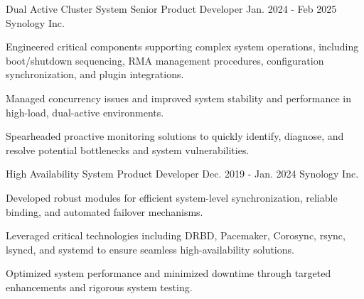 
\begin{cventries}

  \cventry
    {Dual Active Cluster System} %
    {Senior Product Developer} %
    {Jan. 2024 - Feb 2025} %
    {Synology Inc.} %
    {
      \begin{cvitems} %
        \item {Engineered critical components supporting complex system operations, including boot/shutdown sequencing, RMA management procedures, configuration synchronization, and plugin integrations.}
        \item {Managed concurrency issues and improved system stability and performance in high-load, dual-active environments.}
        \item {Spearheaded proactive monitoring solutions to quickly identify, diagnose, and resolve potential bottlenecks and system vulnerabilities.}
      \end{cvitems}
    }

  \cventry
    {High Availability System} %
    {Product Developer} %
    {Dec. 2019 - Jan. 2024} %
    {Synology Inc.} %
    {
      \begin{cvitems} %
        \item {Developed robust modules for efficient system-level synchronization, reliable binding, and automated failover mechanisms.}
        \item {Leveraged critical technologies including DRBD, Pacemaker, Corosync, rsync, lsyncd, and systemd to ensure seamless high-availability solutions.}
        \item {Optimized system performance and minimized downtime through targeted enhancements and rigorous system testing.}
      \end{cvitems}
    }


\end{cventries}

